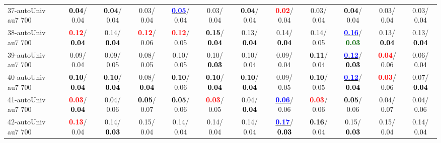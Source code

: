 \begin{table}[h]
\begin{center}
{\begin{tabular}{lc|c|c|c|c|c|c|c|c|c|c}
37-autoUniv au7 700 & \textcolor{black}{\textbf{  0.04}}/  0.04 & \textcolor{black}{\textbf{  0.04}}/  0.04 &   0.03/  0.04 & \underline{\textcolor{blue}{\textbf{  0.05}}}/  0.04 &   0.03/  0.04 & \textcolor{black}{\textbf{  0.04}}/  0.04 & \textcolor{red}{\textbf{  0.02}}/  0.04 &   0.03/  0.04 & \textcolor{black}{\textbf{  0.04}}/  0.04 &   0.03/  0.04 &   0.03/  0.04 \\
38-autoUniv au7 700 & \textcolor{red}{\textbf{  0.12}}/\textcolor{black}{\textbf{  0.04}} &   0.14/\textcolor{black}{\textbf{  0.04}} & \textcolor{red}{\textbf{  0.12}}/  0.06 & \textcolor{red}{\textbf{  0.12}}/  0.05 & \textcolor{black}{\textbf{  0.15}}/\textcolor{black}{\textbf{  0.04}} &   0.13/\textcolor{black}{\textbf{  0.04}} &   0.14/\textcolor{black}{\textbf{  0.04}} &   0.14/  0.05 & \underline{\textcolor{blue}{\textbf{  0.16}}}/\textcolor{darkgreen}{\textbf{  0.03}} &   0.13/\textcolor{black}{\textbf{  0.04}} &   0.13/\textcolor{black}{\textbf{  0.04}} \\
39-autoUniv au7 700 &   0.09/  0.04 &   0.09/  0.05 &   0.08/  0.05 &   0.10/  0.05 &   0.10/\textcolor{black}{\textbf{  0.03}} &   0.10/  0.04 &   0.09/  0.04 & \textcolor{black}{\textbf{  0.11}}/  0.04 & \underline{\textcolor{blue}{\textbf{  0.12}}}/\textcolor{black}{\textbf{  0.03}} & \textcolor{red}{\textbf{  0.04}}/  0.06 &   0.06/  0.04 \\ \hline
40-autoUniv au7 700 & \textcolor{black}{\textbf{  0.10}}/\textcolor{black}{\textbf{  0.04}} & \textcolor{black}{\textbf{  0.10}}/\textcolor{black}{\textbf{  0.04}} &   0.08/\textcolor{black}{\textbf{  0.04}} & \textcolor{black}{\textbf{  0.10}}/  0.06 & \textcolor{black}{\textbf{  0.10}}/\textcolor{black}{\textbf{  0.04}} & \textcolor{black}{\textbf{  0.10}}/\textcolor{black}{\textbf{  0.04}} &   0.09/  0.05 & \textcolor{black}{\textbf{  0.10}}/  0.05 & \underline{\textcolor{blue}{\textbf{  0.12}}}/\textcolor{black}{\textbf{  0.04}} & \textcolor{red}{\textbf{  0.03}}/  0.06 &   0.07/\textcolor{black}{\textbf{  0.04}} \\
41-autoUniv au7 700 & \textcolor{red}{\textbf{  0.03}}/\textcolor{black}{\textbf{  0.04}} &   0.04/  0.06 & \textcolor{black}{\textbf{  0.05}}/  0.07 & \textcolor{black}{\textbf{  0.05}}/  0.06 & \textcolor{red}{\textbf{  0.03}}/  0.05 &   0.04/\textcolor{black}{\textbf{  0.04}} & \underline{\textcolor{blue}{\textbf{  0.06}}}/  0.06 & \textcolor{red}{\textbf{  0.03}}/  0.06 & \textcolor{black}{\textbf{  0.05}}/  0.06 &   0.04/  0.07 &   0.04/  0.06 \\
42-autoUniv au7 700 & \textcolor{red}{\textbf{  0.13}}/  0.04 &   0.14/\textcolor{black}{\textbf{  0.03}} &   0.15/  0.04 &   0.14/  0.04 &   0.14/  0.04 &   0.14/  0.04 & \underline{\textcolor{blue}{\textbf{  0.17}}}/\textcolor{black}{\textbf{  0.03}} & \textcolor{black}{\textbf{  0.16}}/  0.04 &   0.15/\textcolor{black}{\textbf{  0.03}} &   0.15/  0.04 &   0.14/  0.04 \\

\end{tabular}}
\end{center}
\end{table}
